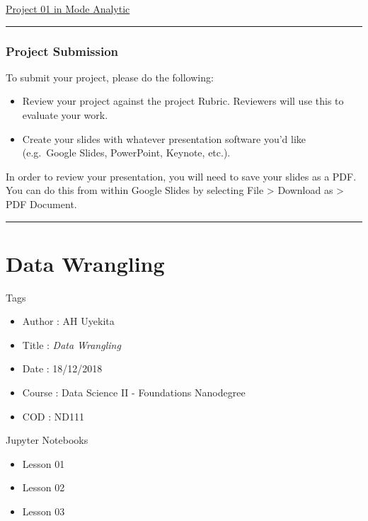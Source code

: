 \documentclass[]{book}
\providecommand{\tightlist}{%
  \setlength{\itemsep}{0pt}\setlength{\parskip}{0pt}}
\begin{document}
\href{https://modeanalytics.com/ah_uyekita/reports/e77643786160}{Project
01 in Mode Analytic}

\begin{center}\rule{0.5\linewidth}{\linethickness}\end{center}

\subsection{Project Submission}\label{project-submission}

To submit your project, please do the following:

\begin{itemize}
\tightlist
\item
  Review your project against the project Rubric. Reviewers will use
  this to evaluate your work.
\item
  Create your slides with whatever presentation software you'd like
  (e.g.~Google Slides, PowerPoint, Keynote, etc.).
\end{itemize}

In order to review your presentation, you will need to save your slides
as a PDF. You can do this from within Google Slides by selecting File
\textgreater{} Download as \textgreater{} PDF Document.

\begin{center}\rule{0.5\linewidth}{\linethickness}\end{center}

\chapter{Data Wrangling}\label{data-wrangling}

Tags

\begin{itemize}
\tightlist
\item
  Author : AH Uyekita
\item
  Title : \emph{Data Wrangling}
\item
  Date : 18/12/2018
\item
  Course : Data Science II - Foundations Nanodegree
\item
  COD : ND111
\end{itemize}

Jupyter Notebooks

\begin{itemize}
\tightlist
\item
  Lesson 01
\item
  Lesson 02
\item
  Lesson 03
\end{itemize}
\end{document}

